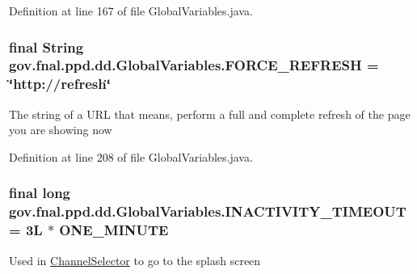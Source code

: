 Definition at line 167 of file Global\-Variables.\-java.

\hypertarget{classgov_1_1fnal_1_1ppd_1_1dd_1_1GlobalVariables_a79c44481889ff937b51e30d13d9c1c35}{
\subsubsection[{F\-O\-R\-C\-E\-\_\-\-R\-E\-F\-R\-E\-S\-H}]{\setlength{\rightskip}{0pt plus 5cm}final String gov.\-fnal.\-ppd.\-dd.\-Global\-Variables.\-F\-O\-R\-C\-E\-\_\-\-R\-E\-F\-R\-E\-S\-H = \char`\"{}http\-://refresh\char`\"{}\hspace{0.3cm}{\ttfamily [static]}}}\label{classgov_1_1fnal_1_1ppd_1_1dd_1_1GlobalVariables_a79c44481889ff937b51e30d13d9c1c35}
The string of a U\-R\-L that means, perform a full and complete refresh of the page you are showing now 

Definition at line 208 of file Global\-Variables.\-java.

\hypertarget{classgov_1_1fnal_1_1ppd_1_1dd_1_1GlobalVariables_ab33d116e6a83d46d778ee5c3521a39a4}{
\subsubsection[{I\-N\-A\-C\-T\-I\-V\-I\-T\-Y\-\_\-\-T\-I\-M\-E\-O\-U\-T}]{\setlength{\rightskip}{0pt plus 5cm}final long gov.\-fnal.\-ppd.\-dd.\-Global\-Variables.\-I\-N\-A\-C\-T\-I\-V\-I\-T\-Y\-\_\-\-T\-I\-M\-E\-O\-U\-T = 3\-L $\ast$ O\-N\-E\-\_\-\-M\-I\-N\-U\-T\-E\hspace{0.3cm}{\ttfamily [static]}}}\label{classgov_1_1fnal_1_1ppd_1_1dd_1_1GlobalVariables_ab33d116e6a83d46d778ee5c3521a39a4}
Used in \hyperlink{classgov_1_1fnal_1_1ppd_1_1dd_1_1ChannelSelector}{Channel\-Selector} to go to the splash screen 

